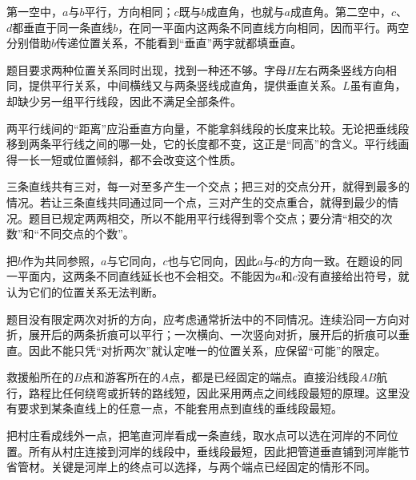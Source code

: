 \documentclass[multi=snippet,border=0pt]{standalone}
\newenvironment{snippet}[3]{\begin{minipage}{#1bp}\color{answerred}\fontsize{#2}{#3}\selectfont\raggedright}{\end{minipage}}
\begin{document}
\begin{snippet}{505}{11.5}{14}第一空中，\(a\)与\(b\)平行，方向相同；\(c\)既与\(b\)成直角，也就与\(a\)成直角。第二空中，\(c\)、\(d\)都垂直于同一条直线\(b\)，在同一平面内这两条不同直线方向相同，因而平行。两空分别借助\(b\)传递位置关系，不能看到“垂直”两字就都填垂直。\end{snippet}
\begin{snippet}{505}{11.5}{14}题目要求两种位置关系同时出现，找到一种还不够。字母\(H\)左右两条竖线方向相同，提供平行关系，中间横线又与两条竖线成直角，提供垂直关系。\(L\)虽有直角，却缺少另一组平行线段，因此不满足全部条件。\end{snippet}
\begin{snippet}{505}{11.5}{14}两平行线间的“距离”应沿垂直方向量，不能拿斜线段的长度来比较。无论把垂线段移到两条平行线之间的哪一处，它的长度都不变，这正是“同高”的含义。平行线画得一长一短或位置倾斜，都不会改变这个性质。\end{snippet}
\begin{snippet}{505}{11.5}{14}三条直线共有三对，每一对至多产生一个交点；把三对的交点分开，就得到最多的情况。若让三条直线共同通过同一个点，三对产生的交点重合，就得到最少的情况。题目已规定两两相交，所以不能用平行线得到零个交点；要分清“相交的次数”和“不同交点的个数”。\end{snippet}
\begin{snippet}{505}{11.5}{14}把\(b\)作为共同参照，\(a\)与它同向，\(c\)也与它同向，因此\(a\)与\(c\)的方向一致。在题设的同一平面内，这两条不同直线延长也不会相交。不能因为\(a\)和\(c\)没有直接给出符号，就认为它们的位置关系无法判断。\end{snippet}
\begin{snippet}{505}{11.5}{14}题目没有限定两次对折的方向，应考虑通常折法中的不同情况。连续沿同一方向对折，展开后的两条折痕可以平行；一次横向、一次竖向对折，展开后的折痕可以垂直。因此不能只凭“对折两次”就认定唯一的位置关系，应保留“可能”的限定。\end{snippet}
\begin{snippet}{505}{11.5}{14}救援船所在的\(B\)点和游客所在的\(A\)点，都是已经固定的端点。直接沿线段\(AB\)航行，路程比任何绕弯或折转的路线短，因此采用两点之间线段最短的原理。这里没有要求到某条直线上的任意一点，不能套用点到直线的垂线段最短。\end{snippet}
\begin{snippet}{505}{11.5}{14}把村庄看成线外一点，把笔直河岸看成一条直线，取水点可以选在河岸的不同位置。所有从村庄连接到河岸的线段中，垂线段最短，因此把管道垂直铺到河岸能节省管材。关键是河岸上的终点可以选择，与两个端点已经固定的情形不同。\end{snippet}
\end{document}
